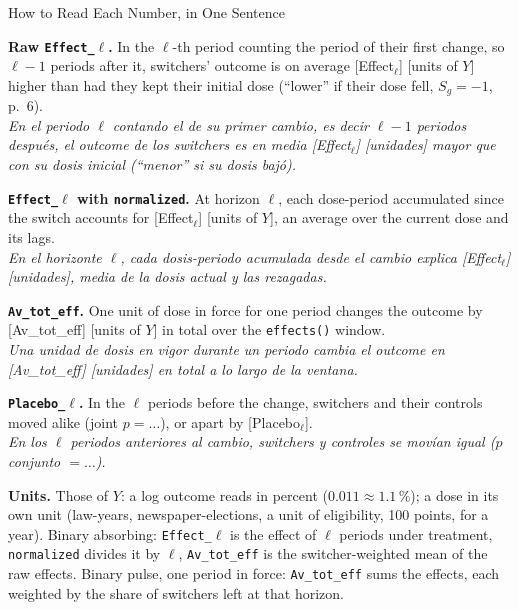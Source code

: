 \documentclass[main.tex]{subfiles}
\begin{document}
\begin{frame}{How to Read Each Number, in One Sentence}

  \scriptsize
  \textbf{Raw \texttt{Effect\_}$\ell$.} In the $\ell$-th period counting the
  period of their first change, so $\ell-1$ periods after it, switchers'
  outcome is on average [Effect$_\ell$] [units of $Y$] higher than had they
  kept their initial dose (``lower'' if their dose fell, $S_g=-1$, p.~6).\\
  \textit{En el periodo $\ell$ contando el de su primer cambio, es decir
  $\ell-1$ periodos después, el outcome de los switchers es en media
  [Effect$_\ell$] [unidades] mayor que con su dosis inicial (``menor'' si su
  dosis bajó).}

  \medskip
  \textbf{\texttt{Effect\_}$\ell$ with \texttt{normalized}.} At horizon $\ell$,
  each dose-period accumulated since the switch accounts for [Effect$_\ell$]
  [units of $Y$], an average over the current dose and its lags.\\
  \textit{En el horizonte $\ell$, cada dosis-periodo acumulada desde el cambio
  explica [Effect$_\ell$] [unidades], media de la dosis actual y las
  rezagadas.}

  \medskip
  \textbf{\texttt{Av\_tot\_eff}.} One unit of dose in force for one period
  changes the outcome by [Av\_tot\_eff] [units of $Y$] in total over the
  \texttt{effects()} window.\\
  \textit{Una unidad de dosis en vigor durante un periodo cambia el outcome en
  [Av\_tot\_eff] [unidades] en total a lo largo de la ventana.}

  \medskip
  \textbf{\texttt{Placebo\_}$\ell$.} In the $\ell$ periods before the change,
  switchers and their controls moved alike (joint $p = \ldots$), or apart by
  [Placebo$_\ell$].\\
  \textit{En los $\ell$ periodos anteriores al cambio, switchers y controles se
  movían igual ($p$ conjunto $= \ldots$).}

  \medskip
  \textbf{Units.} Those of $Y$: a log outcome reads in percent ($0.011
  \approx 1.1$\,\%); a dose in its own unit (law-years, newspaper-elections,
  a unit of eligibility, 100 points, for a year). Binary absorbing:
  \texttt{Effect\_}$\ell$ is the effect of $\ell$ periods under treatment,
  \texttt{normalized} divides it by $\ell$, \texttt{Av\_tot\_eff} is the
  switcher-weighted mean of the raw effects. Binary pulse, one period in
  force: \texttt{Av\_tot\_eff} sums the effects, each weighted by the share
  of switchers left at that horizon.

\end{frame}
\end{document}
